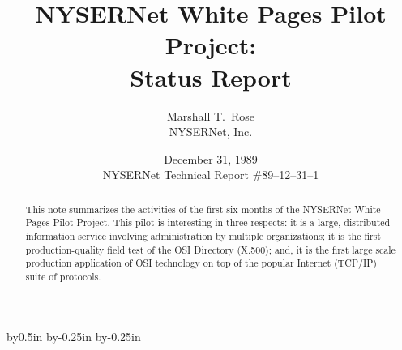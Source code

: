 



\advance\textwidth by0.5in
\advance\oddsidemargin by-0.25in
\advance\evensidemargin by-0.25in

\makeatletter
\let\titlep@ge=\titlepage
\def\titlepage{\titlep@ge \def\thefootnote{\fnsymbol{footnote}}}

\let\endtitlep@ge=\endtitlepage
\let\endtitlepage=\relax

\let\m@ketitle=\maketitle
\def\maketitle{\m@ketitle\let\titlepage=\relax\let\endtitlepage=\endtitlep@ge}
\makeatother



\title{NYSERNet White Pages Pilot Project:\\ Status Report}
\author{Marshall T.~Rose\\ NYSERNet, Inc.}
\date{December 31, 1989\\[0.25in]
NYSERNet Technical Report \#89--12--31--1}
\maketitle

\begin{abstract}
This note summarizes the activities of the first six months of the NYSERNet
White Pages Pilot Project.
This pilot is interesting in three respects:
it is a large, distributed information service involving administration by
multiple organizations;
it is the first production-quality field test of the OSI Directory (X.500);
and,
it is the first large scale production application of OSI technology on top of
the popular Internet (TCP/IP) suite of protocols.

\end{abstract}

\newpage\thispagestyle{empty}
\tableofcontents
{}



\showsummary


